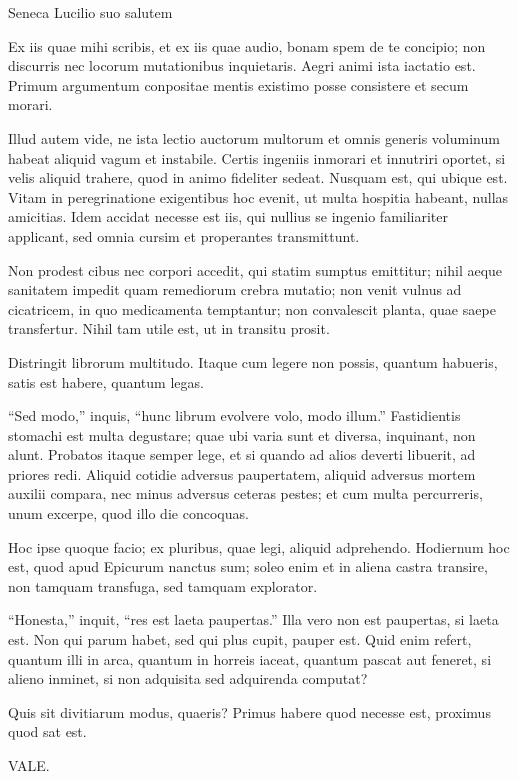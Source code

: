 {\large
\noindent Seneca Lucilio suo salutem

\medskip


\noindent Ex iis quae mihi scribis, et ex iis quae audio, bonam spem de te concipio; non discurris nec locorum mutationibus inquietaris. Aegri animi ista iactatio est. Primum argumentum conpositae mentis existimo posse consistere et secum morari.


Illud autem vide, ne ista lectio auctorum multorum et omnis generis voluminum habeat aliquid vagum et instabile. Certis ingeniis inmorari et innutriri oportet, si velis aliquid trahere, quod in animo fideliter sedeat. Nusquam est, qui ubique est. Vitam in peregrinatione exigentibus hoc evenit, ut multa hospitia habeant, nullas amicitias. Idem accidat necesse est iis, qui nullius se ingenio familiariter applicant, sed omnia cursim et properantes transmittunt.

Non prodest cibus nec corpori accedit, qui statim sumptus emittitur; nihil aeque sanitatem impedit quam remediorum crebra mutatio; non venit vulnus ad cicatricem, in quo medicamenta temptantur; non convalescit planta, quae saepe transfertur. Nihil tam utile est, ut in transitu prosit. 

Distringit librorum multitudo. Itaque cum legere non possis, quantum habueris, satis est habere, quantum legas.

``Sed modo,'' inquis, ``hunc librum evolvere volo, modo illum.'' Fastidientis stomachi est multa degustare; quae ubi varia sunt et diversa, inquinant, non alunt. Probatos itaque semper lege, et si quando ad alios deverti libuerit, ad priores redi. Aliquid cotidie adversus paupertatem, aliquid adversus mortem auxilii compara, nec minus adversus ceteras pestes; et cum multa percurreris, unum excerpe, quod illo die concoquas.

Hoc ipse quoque facio; ex pluribus, quae legi, aliquid adprehendo. Hodiernum hoc est, quod apud Epicurum nanctus sum; soleo enim et in aliena castra transire, non tamquam transfuga, sed tamquam explorator.

``Honesta,'' inquit, ``res est laeta paupertas.'' Illa vero non est paupertas, si laeta est. Non qui parum habet, sed qui plus cupit, pauper est. Quid enim refert, quantum illi in arca, quantum in horreis iaceat, quantum pascat aut feneret, si alieno inminet, si non adquisita sed adquirenda computat? 

Quis sit divitiarum modus, quaeris? Primus habere quod necesse est, proximus quod sat est. 

VALE.

}




